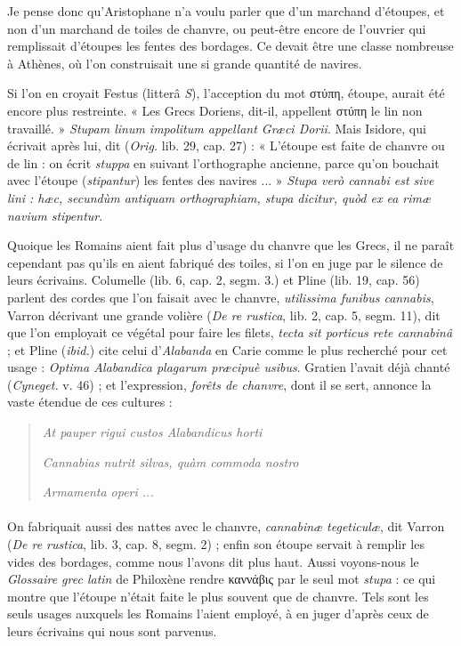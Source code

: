 \documentclass[a4paper, 11pt, oneside, polutonikogreek]{article}
\begin{document}
Je pense donc qu'Aristophane n'a voulu parler que d'un marchand d'étoupes, et non d'un marchand de toiles de chanvre, ou peut-être encore de l'ouvrier qui remplissait d'étoupes les fentes des bordages. Ce devait être une classe nombreuse à Athènes, où l'on construisait une si grande quantité de navires.

Si l'on en croyait Festus (litterâ \emph{S}), l'acception du mot στύπη, étoupe, aurait été encore plus restreinte. « Les Grecs Doriens, dit-il, appellent στύπη le lin non travaillé. » \emph{Stupam linum impolitum appellant Græci Dorii}. Mais Isidore, qui écrivait après lui, dit (\emph{Orig.} lib. 29, cap. 27) : « L'étoupe est faite de chanvre ou de lin : on écrit \emph{stuppa} en suivant l'orthographe ancienne, parce qu'on bouchait avec l'étoupe (\emph{stipantur}) les fentes des navires ... » \emph{Stupa verò cannabi est sive lini : hæc, secundùm antiquam orthographiam, stupa dicitur, quòd ex ea rimæ navium stipentur}.

Quoique les Romains aient fait plus d'usage du chanvre que les Grecs, il ne paraît cependant pas qu'ils en aient fabriqué des toiles, si l'on en juge par le silence de leurs écrivains. Columelle (lib. 6, cap. 2, segm. 3.) et Pline (lib. 19, cap. 56) parlent des cordes que l'on faisait avec le chanvre, \emph{utilissima funibus cannabis}, Varron décrivant une grande volière (\emph{De re rustica}, lib. 2, cap. 5, segm. 11), dit que l'on employait ce végétal pour faire les filets, \emph{tecta sit porticus rete cannabinâ} ; et Pline (\emph{ibid.}) cite celui d'\emph{Alabanda} en Carie comme le plus recherché pour cet usage : \emph{Optima Alabandica plagarum præcipuè usibus}. Gratien l'avait déjà chanté (\emph{Cyneget.} v. 46) ; et l'expression, \emph{forêts de chanvre}, dont il se sert, annonce la vaste étendue de ces cultures :
\begin{quotation}
\emph{At pauper rigui custos Alabandicus horti}

\emph{Cannabias nutrit silvas, quàm commoda nostro}

\emph{Armamenta operi ...}
\end{quotation}
\paragraph{}
On fabriquait aussi des nattes avec le chanvre, \emph{cannabinæ tegeticulæ}, dit Varron (\emph{De re rustica}, lib. 3, cap. 8, segm. 2) ; enfin son étoupe servait à remplir les vides des bordages, comme nous l'avons dit plus haut. Aussi voyons-nous le \emph{Glossaire grec latin} de Philoxène rendre καννάβις par le seul mot \emph{stupa} : ce qui montre que l'étoupe n'était faite le plus souvent que de chanvre. Tels sont les seuls usages auxquels les Romains l'aient employé, à en juger d'après ceux de leurs écrivains qui nous sont parvenus.
\end{document}
